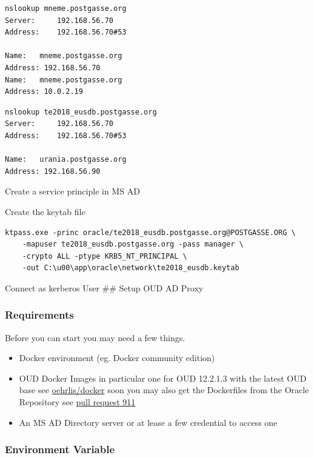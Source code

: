 \documentclass[a4paper,,tablecaptionabove]{scrartcl}
\providecommand{\tightlist}{\setlength{\itemsep}{0pt}\setlength{\parskip}{0pt}}
\begin{document}
\begin{lstlisting}[language=bash]
nslookup mneme.postgasse.org
Server:     192.168.56.70
Address:    192.168.56.70#53

Name:   mneme.postgasse.org
Address: 192.168.56.70
Name:   mneme.postgasse.org
Address: 10.0.2.19
\end{lstlisting}

\begin{lstlisting}[language=bash]
nslookup te2018_eusdb.postgasse.org
Server:     192.168.56.70
Address:    192.168.56.70#53

Name:   urania.postgasse.org
Address: 192.168.56.90
\end{lstlisting}

Create a service principle in MS AD

Create the keytab file

\begin{lstlisting}
ktpass.exe -princ oracle/te2018_eusdb.postgasse.org@POSTGASSE.ORG \
    -mapuser te2018_eusdb.postgasse.org -pass manager \
    -crypto ALL -ptype KRB5_NT_PRINCIPAL \
    -out C:\u00\app\oracle\network\te2018_eusdb.keytab
\end{lstlisting}

Connect as kerberos User \#\# Setup OUD AD Proxy

\hypertarget{requirements}{%
\subsubsection{Requirements}\label{requirements}}

Before you can start you may need a few things.

\begin{itemize}
\tightlist
\item
  Docker environment (eg. Docker community edition)
\item
  OUD Docker Images in particular one for OUD 12.2.1.3 with the latest
  OUD base see \href{https://github.com/oehrlis/docker}{oehrlis/docker}
  soon you may also get the Dockerfiles from the Oracle Repository see
  \href{https://github.com/oracle/docker-images/pull/911}{pull request
  911}
\item
  An MS AD Directory server or at lease a few credential to access one
\end{itemize}

\hypertarget{environment-variable}{%
\subsubsection{Environment Variable}\label{environment-variable}}
\end{document}
